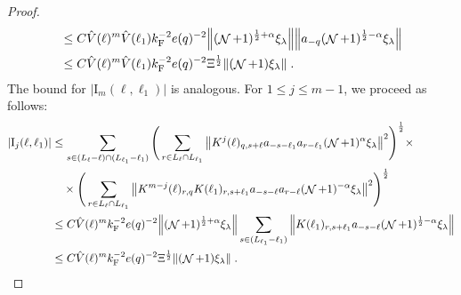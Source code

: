 \documentclass[12pt,a4paper]{article}
\numberwithin{equation}{section}
\newcommand{\1}{\mathbb{I}}
\newcommand{\F}{\mathrm{F}}
\newcommand{\I}{\mathrm{I}}
\DeclareMathOperator{\NN}{\mathcal{N}}
\newcommand{\half}{\frac{1}{2}}
\theoremstyle{plain}
\theoremstyle{definition}
\theoremstyle{remark}
\theoremstyle{plain}
\theoremstyle{definition}
\theoremstyle{remark}
\begin{document}
\begin{proof}
\begin{align}
	&\leq C \hat{V}(\ell)^m \hat{V}(\ell_1) k_{\F}^{-2} e(q)^{-2} \norm{ (\NN+1)^{\half+\alpha} \xi_\lambda} \norm{ a_{-q} (\NN+1)^{\half-\alpha} \xi_\lambda } \nonumber \\
	&\leq C \hat{V}(\ell)^m \hat{V}(\ell_1) k_{\F}^{-2} e(q)^{-2} \Xi^{\half} \norm{ (\NN+1) \xi_\lambda} \;.
\end{align}
The bound for $ |\I_m(\ell, \ell_1)| $ is analogous. For $ 1 \le j \le m-1 $, we proceed as follows:
\begin{align}
	|\I_j(\ell, \ell_1)|
	&\leq  \sum\limits_{ s \in (L_{\ell}-\ell) \cap (L_{\ell_1}-\ell_1)}   \Bigg(\sum\limits_{r\in L_{\ell} \cap L_{\ell_1}} \norm{ K^{j}(\ell)_{q,s+\ell} a_{-s-\ell_1} a_{r-\ell_1} (\NN+1)^{\alpha}\xi_\lambda}^2\Bigg)^\half\nonumber \times \\ 
    		&\quad \times\Bigg( \sum\limits_{ r\in L_{\ell} \cap L_{\ell_1}}
		\norm{ K^{m-j}(\ell)_{r,q} K(\ell_1)_{r,s+\ell_1} a_{-s-\ell}a_{r-\ell} (\NN+1)^{-\alpha} \xi_\lambda }^2\Bigg)^\half \nonumber\\
	&\leq C \hat{V}(\ell)^m k_{\F}^{-2} e(q)^{-2} 
		\norm{(\NN+1)^{\half+\alpha}\xi_\lambda}
		\sum\limits_{ s \in (L_{\ell_1}-\ell_1)}
		\norm{ K(\ell_1)_{r,s+\ell_1} a_{-s-\ell} (\NN+1)^{\half-\alpha} \xi_\lambda } \nonumber \\
	&\leq C \hat{V}(\ell)^m k_{\F}^{-2} e(q)^{-2} \Xi^{\half}
		\norm{(\NN+1) \xi_\lambda} \;.
\end{align} 
\end{proof}

\end{document}
